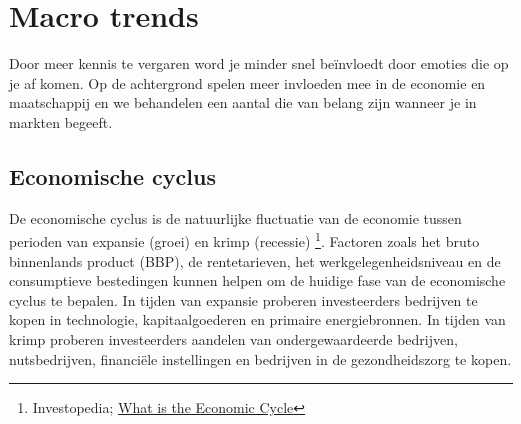 
\section{Macro trends}
Door meer kennis te vergaren word je minder snel be\"invloedt door emoties die op je af komen. Op de achtergrond spelen meer invloeden mee in de economie en maatschappij en we behandelen een aantal die van belang zijn wanneer je in markten begeeft.

    \begin{quotation}
      \textit{}
      \end{quotation}
   
\subsection{Economische cyclus}
De economische cyclus is de natuurlijke fluctuatie van de economie tussen perioden van expansie (groei) en krimp (recessie) \footnote{Investopedia; \href{https://www.investopedia.com/terms/e/economic-cycle.asp}{What is the Economic Cycle}}. Factoren zoals het bruto binnenlands product (BBP), de rentetarieven, het werkgelegenheidsniveau en de consumptieve bestedingen kunnen helpen om de huidige fase van de economische cyclus te bepalen. In tijden van expansie proberen investeerders bedrijven te kopen in technologie, kapitaalgoederen en primaire energiebronnen. In tijden van krimp proberen investeerders aandelen van ondergewaardeerde bedrijven, nutsbedrijven, financi\"ele instellingen en bedrijven in de gezondheidszorg te kopen.


       
